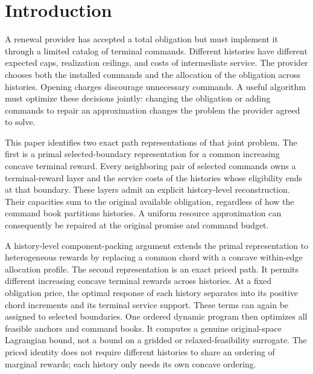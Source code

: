 \section{Introduction}
A renewal provider has accepted a total obligation but must implement it through a limited catalog of terminal commands. Different histories have different expected caps, realization ceilings, and costs of intermediate service. The provider chooses both the installed commands and the allocation of the obligation across histories. Opening charges discourage unnecessary commands. A useful algorithm must optimize these decisions jointly: changing the obligation or adding commands to repair an approximation changes the problem the provider agreed to solve.

This paper identifies two exact path representations of that joint problem. The first is a primal selected-boundary representation for a common increasing concave terminal reward. Every neighboring pair of selected commands owns a terminal-reward layer and the service costs of the histories whose eligibility ends at that boundary. These layers admit an explicit history-level reconstruction. Their capacities sum to the original available obligation, regardless of how the command book partitions histories. A uniform resource approximation can consequently be repaired at the original promise and command budget.

A history-level component-packing argument extends the primal representation to heterogeneous rewards by replacing a common chord with a concave within-edge allocation profile. The second representation is an exact priced path. It permits different increasing concave terminal rewards across histories. At a fixed obligation price, the optimal response of each history separates into its positive chord increments and its terminal service support. These terms can again be assigned to selected boundaries. One ordered dynamic program then optimizes all feasible anchors and command books. It computes a genuine original-space Lagrangian bound, not a bound on a gridded or relaxed-feasibility surrogate. The priced identity does not require different histories to share an ordering of marginal rewards; each history only needs its own concave ordering.

